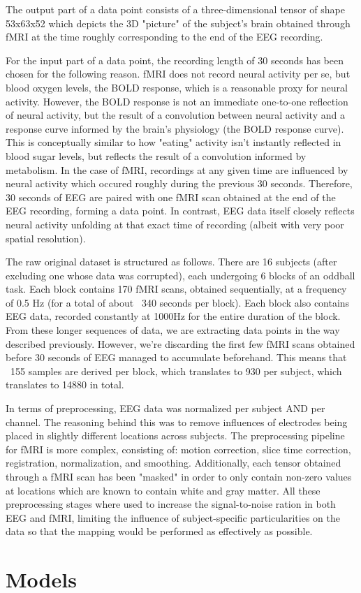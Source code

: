 \documentclass{article}
\begin{document}
The output part of a data point consists of a three-dimensional tensor of shape 53x63x52 which depicts the 3D "picture" of the subject's brain obtained through fMRI at the time roughly corresponding to the end of the EEG recording.

For the input part of a data point, the recording length of 30 seconds has been chosen for the following reason. fMRI does not record neural activity per se, but blood oxygen levels, the BOLD response, which is a reasonable proxy for neural activity. However, the BOLD response is not an immediate one-to-one reflection of neural activity, but the result of a convolution between neural activity and a response curve informed by the brain's physiology (the BOLD response curve). This is conceptually similar to how "eating" activity isn't instantly reflected in blood sugar levels, but reflects the result of a convolution informed by metabolism. In the case of fMRI, recordings at any given time are influenced by neural activity which occured roughly during the previous 30 seconds. Therefore, 30 seconds of EEG are paired with one fMRI scan obtained at the end of the EEG recording, forming a data point. In contrast, EEG data itself closely reflects neural activity unfolding at that exact time of recording (albeit with very poor spatial resolution).

The raw original dataset is structured as follows. There are 16 subjects (after excluding one whose data was corrupted), each undergoing 6 blocks of an oddball task. Each block contains 170 fMRI scans, obtained sequentially, at a frequency of 0.5 Hz (for a total of about ~340 seconds per block). Each block also contains EEG data, recorded constantly at 1000Hz for the entire duration of the block. From these longer sequences of data, we are extracting data points in the way described previously. However, we're discarding the first few fMRI scans obtained before 30 seconds of EEG managed to accumulate beforehand. This means that ~155 samples are derived per block, which translates to 930 per subject, which translates to 14880 in total.

In terms of preprocessing, EEG data was normalized per subject AND per channel. The reasoning behind this was to remove influences of electrodes being placed in slightly different locations across subjects. The preprocessing pipeline for fMRI is more complex, consisting of: motion correction, slice time correction, registration, normalization, and smoothing. Additionally, each tensor obtained through a fMRI scan has been "masked" in order to only contain non-zero values at locations which are known to contain white and gray matter. All these preprocessing stages where used to increase the signal-to-noise ration in both EEG and fMRI, limiting the influence of subject-specific particularities on the data so that the mapping would be performed as effectively as possible.

\section{Models}
\end{document}
